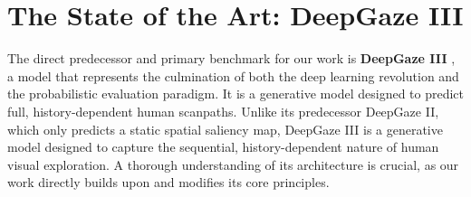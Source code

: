 \section{The State of the Art: DeepGaze III}
\label{sec:sota_deepgaze3}
The direct predecessor and primary benchmark for our work is \textbf{DeepGaze III} \cite{kummerer2022deepgaze}, a model that represents the culmination of both the deep learning revolution and the probabilistic evaluation paradigm. It is a generative model designed to predict full, history-dependent human scanpaths.
Unlike its predecessor DeepGaze II, which only predicts a static spatial saliency map, DeepGaze III is a generative model designed to capture the sequential, history-dependent nature of human visual exploration. A thorough understanding of its architecture is crucial, as our work directly builds upon and modifies its core principles.
